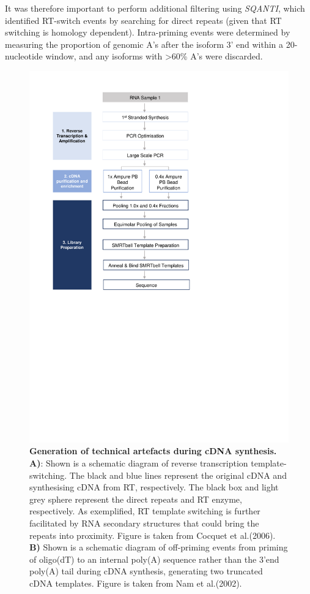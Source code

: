 It was therefore important to perform additional filtering using \textit{SQANTI}, which identified RT-switch events by searching for direct repeats (given that RT switching is homology dependent). Intra-priming events were determined by measuring the proportion of genomic A's after the isoform 3' end within a 20-nucleotide window, and any isoforms with >60\% A's were discarded. 

\begin{figure}[h]
	\begin{center}
		\includegraphics[page=4,trim={2cm 21.5cm 0 1cm},clip, scale = 0.9]{Figures/ProjectDevelopment_Figures.pdf}
	\end{center}
	\captionsetup{width=0.95\textwidth}
	\caption[Generation of technical artefacts during cDNA synthesis]%
	{\textbf{Generation of technical artefacts during cDNA synthesis. A)}: Shown is a schematic diagram of reverse transcription template-switching. The black and blue lines represent the original cDNA and synthesising cDNA from RT, respectively. The black box and light grey sphere represent the direct repeats and RT enzyme, respectively. As exemplified, RT template switching is further facilitated by RNA secondary structures that could bring the repeats into proximity\cite{Cocquet2006}. Figure is taken from Cocquet et al.(2006)\cite{Cocquet2006}. \textbf{B)} Shown is a schematic diagram of off-priming events from priming of oligo(dT) to an internal poly(A) sequence rather than the 3'end poly(A) tail during cDNA synthesis, generating two truncated cDNA templates. Figure is taken from Nam et al.(2002)\cite{Nam2002}. }

\end{figure}
